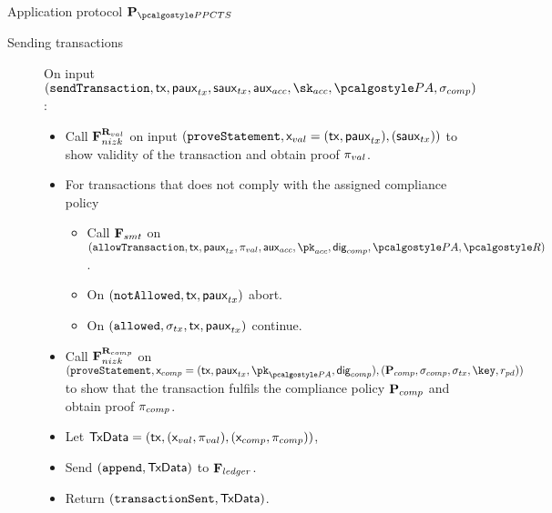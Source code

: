 \documentclass[runningheads,10pt]{llncs}
\numberwithin{equation}{section}
\begin{document}
\begin{protbox}{Application protocol $\prot{\PPCTS}$}
\begin{description}
  \item[Sending transactions] On input $(\sendTransaction,  \tx, \pauxtx,
    \sauxtx, \auxacc, \skacc, \polas, \signature_{comp})$:
    \begin{itemize}
    \item Call $\mathbf{F}_{{nizk}}^{\mathbf{R}_{val}}$ on input $(\mathtt{proveStatement},
      \mathsf{x}_{val} = (\mathsf{tx}, \mathsf{paux}_{tx}), (\mathsf{saux}_{tx}))$ to show validity of the
      transaction and obtain proof $\mathsf{\pi}_{val}$.
    \item For transactions that does not comply with the assigned compliance policy
      \begin{itemize}
      \item Call $\mathbf{F}_{{smt}}$ on
        $(\allowTransaction, \tx, \paux_{tx}, \zkproof_{val}, \auxacc, \pk_{acc}, \policydig, \polas,
        \relay)$.
      \item On $(\mathtt{notAllowed}, \mathsf{tx}, \mathsf{paux}_{tx})$ abort.
      \item On $(\mathtt{allowed}, \sigma_{tx}, \mathsf{tx}, \mathsf{paux}_{tx})$ continue.
      \end{itemize}
    \item Call $\mathbf{F}_{{nizk}}^{\mathbf{R}_{comp}}$ on
      $(\proveStatement, \inp_{comp} = (\tx, \paux_{tx}, \pk_{\polas}, \policydig),
      (\comppolicy, \signature_{comp}, \signature_{tx}, \key, r_{pd}))$ to show that
      the transaction fulfils the compliance policy $\mathbf{P}_{comp}$ and obtain proof
      $\mathsf{\pi}_{comp}$.
    \item Let
      $\mathsf{TxData} = (\mathsf{tx}, (\mathsf{x}_{val}, \mathsf{\pi}_{val}), (\mathsf{x}_{comp},
      \mathsf{\pi}_{comp}))$,
    \item Send $(\mathtt{append}, \mathsf{TxData})$ to $\mathbf{F}_{{ledger}}$.
    \item Return $(\mathtt{transactionSent}, \mathsf{TxData})$.
    \end{itemize}


\end{description}
\end{protbox}
\end{document}
